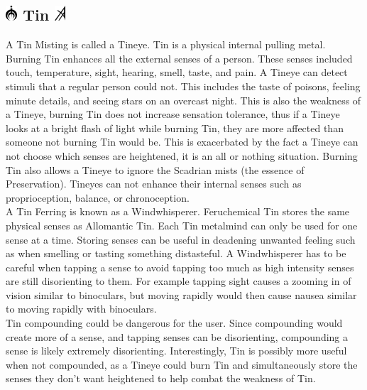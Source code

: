 \documentclass[conference]{IEEEtran}
\begin{document}
\subsection*{\includegraphics[height=1em]{images/Tin.png}  Tin \includegraphics[height=1em]{images/Tin_(Feruchemy).png}}
A Tin Misting is called a Tineye.  Tin is a physical internal pulling metal.  Burning Tin enhances all the external senses of a person.  These senses included touch, temperature, sight, hearing, smell, taste, and pain.  A Tineye can detect stimuli that a regular person could not.  This includes the taste of poisons, feeling minute details, and seeing stars on an overcast night.  This is also the weakness of a Tineye, burning Tin does not increase sensation tolerance, thus if a Tineye looks at a bright flash of light while burning Tin, they are more affected than someone not burning Tin would be.  This is exacerbated by the fact a Tineye can not choose which senses are heightened, it is an all or nothing situation.  Burning Tin also allows a Tineye to ignore the Scadrian mists (the essence of Preservation).  Tineyes can not enhance their internal senses such as proprioception, balance, or chronoception.\\

A Tin Ferring is known as a Windwhisperer.  Feruchemical Tin stores the same physical senses as Allomantic Tin.  Each Tin metalmind can only be used for one sense at a time.  Storing senses can be useful in deadening unwanted feeling such as when smelling or tasting something distasteful. 
A Windwhisperer has to be careful when tapping a sense to avoid tapping too much as high intensity senses are still disorienting to them.  For example tapping sight causes a zooming in of vision similar to binoculars, but moving rapidly would then cause nausea similar to moving rapidly with binoculars.   \\

Tin compounding could be dangerous for the user.  Since compounding would create more of a sense, and tapping senses can be disorienting, compounding a sense is likely extremely disorienting.  Interestingly, Tin is possibly more useful when not compounded, as a Tineye could burn Tin and simultaneously store the senses they don't want heightened to help combat the weakness of Tin.\\
\end{document}
